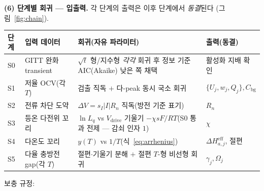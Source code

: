 \documentclass[11pt,a4paper]{article}
\newcommand{\eff}{\mathrm{eff}}
\newcommand{\drive}{\mathrm{drive}}
\newcommand{\bg}{\mathrm{bg}}
\begin{document}
\textbf{(6) 단계별 회귀 — 입출력.} 각 단계의 출력은 이후 단계에서 \emph{동결}된다
(그림~\ref{fig:chain}).
\begin{center}
\renewcommand{\arraystretch}{1.35}
\begin{tabular}{p{} p{} p{} p{}}
\toprule
단계 & 입력 데이터 & 회귀(자유 파라미터) & 출력(동결) \\
\midrule
S0 & GITT 완화 transient & $\sqrt t$ 형/지수형 \emph{각각} 회귀 후 정보 기준 AIC(Akaike) 낮은 쪽 채택 & 활성화 지배 확인 \\
S1 & 저율 OCV(각 $T$) & 검출 직독 $+$ 다-peak 동시 국소 회귀 & $\{U_j,w_j,Q_j\},C_\bg$ \\
S2 & 전류 차단 도약 & $\Delta V=s_I|I|R_n$ 직독(방전 기준 표기) & $R_n$ \\
S3 & 등온 다전위 꼬리 & $\ln L_q$ vs $V_\drive$ 기울기 $-\chi sF/RT$(S0 통과 전제 — 감쇠 인자 $1$) & $\chi$ \\
S4 & 다온도 꼬리 & $y(T)$ vs $1/T$(식~\eqref{eq:arrhenius}) & $\Delta H_{a,j}^{\eff}$, 절편 \\
S5 & 다율 충방전 gap(각 $T$) & 절편$\cdot$기울기 분해 $+$ 절편 $T$-형 비선형 회귀 & $\gamma_j,\Omega_j$ \\
\bottomrule
\end{tabular}
\end{center}
보충 규정:
\end{document}
